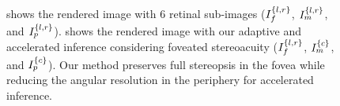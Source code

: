 \begin{figure}[tbh]
    \centering
    
    
    {%
     shows the rendered image with 6 retinal sub-images ($I_{f}^{\{l,r\}}$, $I_{m}^{\{l,r\}}$, and $I_{p}^{\{l,r\}}$).
     shows the rendered image with our adaptive and accelerated inference considering foveated stereoacuity ($I_{f}^{\{l,r\}}$, $I_{m}^{\{c\}}$, and $I_{p}^{\{c\}}$). Our method preserves full stereopsis in the fovea while reducing the angular resolution in the periphery for accelerated inference.
    }
    \label{fig:mono}
\end{figure}